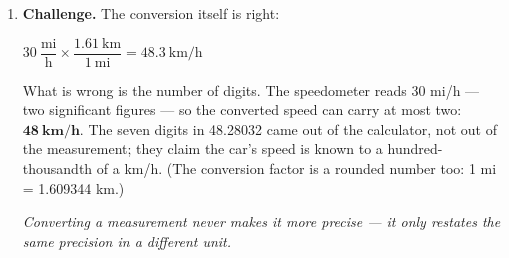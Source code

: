 \documentclass[12pt, twoside]{article}
\begin{document}
\begin{enumerate}[itemsep=0.35cm]
\begin{enumerate}[itemsep=0.3cm]
      $720~\text{in} \times \dfrac{1~\text{ft}}{12~\text{in}} = \mathbf{60~\textbf{ft}}$
      \qquad
      $60~\text{ft} \times \dfrac{1~\text{m}}{3.28~\text{ft}} = 18.29\ldots = \mathbf{18~\textbf{m}}$

      \emph{The step counts are exact, so the 8.0 in riser sets the precision: two
      significant figures.}
    \item $t = \dfrac{90~\text{steps}}{1.2~\text{steps/s}} = \mathbf{75~\textbf{s}} = \mathbf{1~\textbf{min}~15~\textbf{s}}$
    \item $v = \dfrac{60~\text{ft}}{75~\text{s}} = 0.80~\dfrac{\text{ft}}{\text{s}}
      \times \dfrac{60~\text{s}}{1~\text{min}} = \mathbf{48~\textbf{ft/min}}$

      $v = \dfrac{18.3~\text{m}}{75~\text{s}} = \mathbf{0.24~\textbf{m/s}}$

      \emph{Check: $0.80 \div 3.28 = 0.244$ m/s --- the two routes agree. This is the
      \emph{vertical} speed; the distance actually walked along the stairs is longer,
      since each step also moves you forward.}
  \end{enumerate}

\item \textbf{Challenge.} The conversion itself is right:

  $30~\dfrac{\text{mi}}{\text{h}} \times \dfrac{1.61~\text{km}}{1~\text{mi}} = 48.3~\text{km/h}$

  What is wrong is the number of digits. The speedometer reads 30 mi/h --- two
  significant figures --- so the converted speed can carry at most two:
  $\mathbf{48~\textbf{km/h}}$. The seven digits in 48.28032 came out of the calculator,
  not out of the measurement; they claim the car's speed is known to a hundred-thousandth
  of a km/h. (The conversion factor is a rounded number too: 1 mi = 1.609344 km.)

  \emph{Converting a measurement never makes it more precise --- it only restates the
  same precision in a different unit.}

\end{enumerate}
\end{document}

